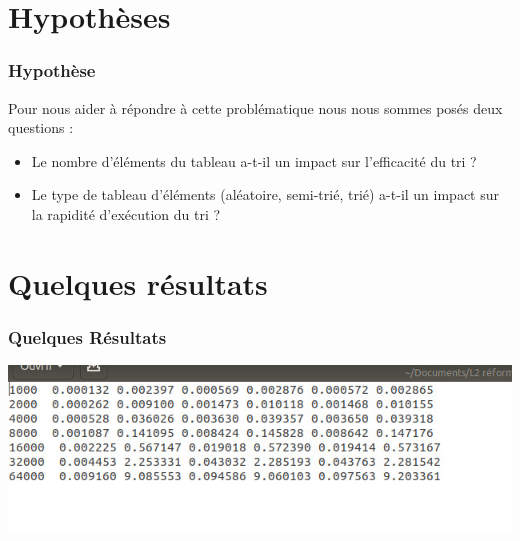 \documentclass[12pt,french]{beamer}
\begin{document}
\section{Hypothèses}
\begin{frame}
\frametitle{Hypothèse}
Pour nous aider à répondre à cette problématique nous nous sommes posés deux questions :
\pause
\begin{itemize}[<+->]
\item Le nombre d’éléments du tableau a-t-il un impact sur l’efficacité du tri ?\\
\item Le type de tableau d’éléments (aléatoire, semi-trié, trié) a-t-il un impact sur la rapidité d’exécution du tri ?  
\end{itemize}
\end{frame}
\section{Quelques résultats}
\begin{frame}
\frametitle{Quelques Résultats}
\begin{center}
\includegraphics[scale=0.4]{images/resultat.jpeg}
\end{center}
\end{frame}
\end{document}
